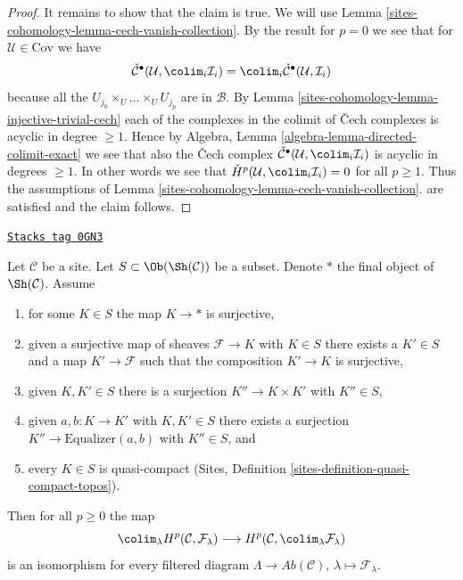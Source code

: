 \begin{proof}
\medskip\noindent
It remains to show that the claim is true. We will use
Lemma \ref{sites-cohomology-lemma-cech-vanish-collection}.
By the result for $p = 0$ we see that for $\mathcal{U} \in \text{Cov}$
we have
$$
\check{\mathcal{C}}^\bullet(\mathcal{U}, \colim_i \mathcal{I}_i)
=
\colim_i \check{\mathcal{C}}^\bullet(\mathcal{U}, \mathcal{I}_i)
$$
because all the $U_{j_0} \times_U \ldots \times_U U_{j_p}$
are in $\mathcal{B}$. By
Lemma \ref{sites-cohomology-lemma-injective-trivial-cech}
each of the complexes in the colimit of {\v C}ech complexes is
acyclic in degree $\geq 1$. Hence by
Algebra, Lemma \ref{algebra-lemma-directed-colimit-exact}
we see that also the {\v C}ech complex
$\check{\mathcal{C}}^\bullet(\mathcal{U}, \colim_i \mathcal{I}_i)$
is acyclic in degrees $\geq 1$. In other words we see that
$\check{H}^p(\mathcal{U}, \colim_i \mathcal{I}_i) = 0$
for all $p \geq 1$. Thus the assumptions of
Lemma \ref{sites-cohomology-lemma-cech-vanish-collection}.
are satisfied and the claim follows.
\end{proof}

\begin{lemma}
\label{sites-cohomology-lemma-colim-global}
\href{https://stacks.math.columbia.edu/tag/0GN3}{\texttt{Stacks tag 0GN3}}

Let $\mathcal{C}$ be a site. Let $S \subset \Ob(\Sh(\mathcal{C}))$
be a subset. Denote $*$ the final object of $\Sh(\mathcal{C})$. Assume
\begin{enumerate}
\item for some $K \in S$ the map $K \to *$ is surjective,
\item given a surjective map of sheaves $\mathcal{F} \to K$ with $K \in S$
there exists a $K' \in S$ and a map $K' \to \mathcal{F}$ such
that the composition $K' \to K$ is surjective,
\item given $K, K' \in S$ there is a surjection $K'' \to K \times K'$
with $K'' \in S$,
\item given $a, b : K \to K'$ with $K, K' \in S$ there exists a
surjection $K'' \to \text{Equalizer}(a, b)$ with $K'' \in S$, and
\item every $K \in S$ is quasi-compact
(Sites, Definition \ref{sites-definition-quasi-compact-topos}).
\end{enumerate}
Then for all $p \geq 0$ the map
$$
\colim_\lambda H^p(\mathcal{C}, \mathcal{F}_\lambda)
\longrightarrow
H^p(\mathcal{C}, \colim_\lambda \mathcal{F}_\lambda)
$$
is an isomorphism for every filtered diagram
$\Lambda \to \textit{Ab}(\mathcal{C})$, $\lambda \mapsto \mathcal{F}_\lambda$.
\end{lemma}

